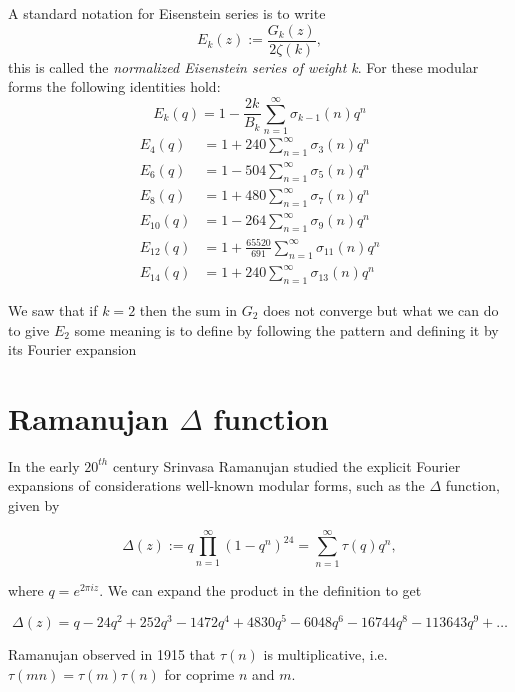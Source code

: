 A standard notation for Eisenstein series is to write 
\[E_k(z):= \frac{G_k(z)}{2\zeta(k)},\]
this is called the \textit{normalized Eisenstein series of weight k}. For these modular
forms the following identities hold:
\[E_k(q) = 1 - \frac{2k}{B_k}\sum_{n=1}^{\infty}\sigma_{k-1}(n)q^n\]
\begin{align*}
    E_4(q) &= 1 + 240\sum_{n=1}^{\infty}\sigma_3(n)q^n \\
    E_6(q) &= 1 -504\sum_{n=1}^{\infty}\sigma_5(n)q^n \\
    E_8(q) &= 1 + 480\sum_{n=1}^{\infty}\sigma_7(n)q^n \\
    E_{10}(q) &= 1 - 264\sum_{n=1}^{\infty}\sigma_{9}(n)q^n \\
    E_{12}(q) &= 1 + \frac{65520}{691}\sum_{n=1}^{\infty}\sigma_{11}(n)q^n \\
    E_{14}(q) &= 1 + 240\sum_{n=1}^{\infty}\sigma_{13}(n)q^n    
\end{align*}

We saw that if $k=2$ then the sum in $G_2$ does not converge but what we can do to give 
$E_2$ some meaning is to define by following the pattern and defining it by its Fourier expansion 


\section{Ramanujan $\Delta$ function}

In the early $20^{th}$ century Srinvasa Ramanujan studied the explicit Fourier expansions of considerations 
well-known modular forms, such as the $\Delta$ function, given by 

\[\Delta(z) := q\prod_{n=1}^{\infty}(1-q^n)^{24} = \sum_{n=1}^{\infty}\tau(q)q^n,\]

where $q = e^{2\pi i z}$. We can expand the product in the definition to get 

\[\Delta(z) = q - 24q^2+ 252q^3 - 1472q^4 + 4830q^5 - 6048q^6 - 16744q^8- 113643q^9 + \ldots\]

\mb 

Ramanujan observed in 1915 that $\tau(n)$ is multiplicative, i.e. $\tau(mn) = \tau(m)\tau(n)$
for coprime $n$ and $m$. 

